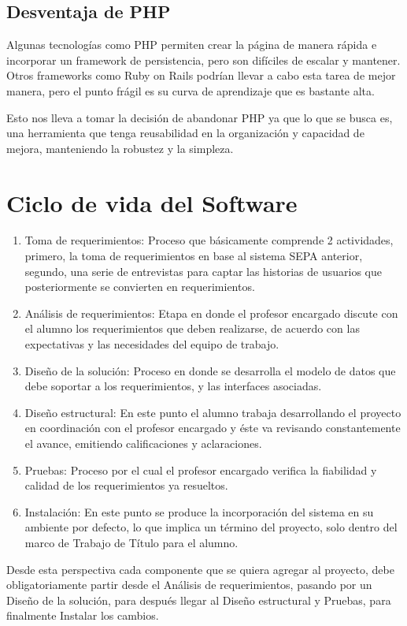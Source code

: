 \documentclass[a4paper,12pt,openany,oneside]{book}
\begin{document}
\subsection{Desventaja de PHP}
Algunas tecnologías como PHP permiten crear la página de manera rápida e incorporar un framework de persistencia, pero son difíciles de escalar y mantener. Otros frameworks como Ruby on Rails podrían llevar a cabo esta tarea de mejor manera, pero el punto frágil es su curva de aprendizaje que es bastante alta.

Esto nos lleva a tomar la decisión de abandonar PHP ya que lo que se busca es, una herramienta que tenga reusabilidad en la organización y capacidad de mejora, manteniendo la robustez y la simpleza.
\section{Ciclo de vida del Software}
\begin{enumerate}
\item Toma de requerimientos: Proceso que básicamente comprende 2 actividades, primero, la toma de requerimientos en base al sistema SEPA anterior, segundo, una serie de entrevistas para captar las historias de usuarios que posteriormente se convierten en requerimientos.
\item Análisis de requerimientos: Etapa en donde el profesor encargado discute con el alumno los requerimientos que deben realizarse, de acuerdo con las expectativas y las necesidades del equipo de trabajo.
\item Diseño de la solución: Proceso en donde se desarrolla el modelo de datos que debe soportar a los requerimientos, y las interfaces asociadas.
\item Diseño estructural: En este punto el alumno trabaja desarrollando el proyecto en coordinación con el profesor encargado y éste va revisando constantemente el avance, emitiendo calificaciones y aclaraciones.
\item Pruebas: Proceso por el cual el profesor encargado verifica la fiabilidad y calidad de los requerimientos ya resueltos.
\item Instalación: En este punto se produce la incorporación del sistema en su ambiente por defecto, lo que implica un término del proyecto, solo dentro del marco de Trabajo de Título para el alumno.
\end{enumerate}

Desde esta perspectiva cada componente que se quiera agregar al proyecto, debe obligatoriamente partir desde el Análisis de requerimientos, pasando por un Diseño de la solución, para después llegar al Diseño estructural y Pruebas, para finalmente Instalar los cambios.
\end{document}
